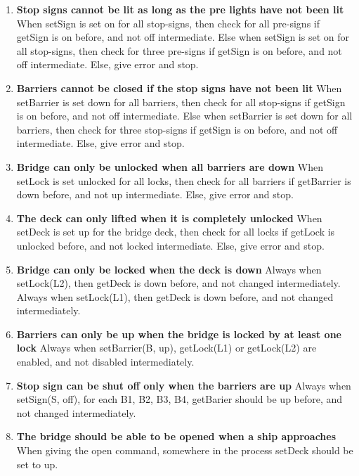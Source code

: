 \documentclass{article}
\begin{document}
\begin{enumerate}
	\item \textbf{Stop signs cannot be lit as long as the pre lights have not been lit}
	When setSign is set on for all stop-signs, then check for all pre-signs if getSign is on before, and not off intermediate.
	Else when setSign is set on for all stop-signs, then check for three pre-signs if getSign is on before, and not off intermediate.
	Else, give error and stop.

	\item \textbf{Barriers cannot be closed if the stop signs have not been lit}
	When setBarrier is set down for all barriers, then check for all stop-signs if getSign is on before, and not off intermediate.
	Else when setBarrier is set down for all barriers, then check for three stop-signs if getSign is on before, and not off intermediate.
	Else, give error and stop.

	\item \textbf{Bridge can only be unlocked when all barriers are down}
	When setLock is set unlocked for all locks, then check for all barriers if getBarrier is down before, and not up intermediate.
	Else, give error and stop.

	\item	\textbf{The deck can only lifted when it is completely unlocked}
	When setDeck is set up for the bridge deck, then check for all locks if getLock is unlocked before, and not locked intermediate.
	Else, give error and stop.

	\item \textbf{Bridge can only be locked when the deck is down}
	Always when setLock(L2), then getDeck is down before, and not changed intermediately.
	Always when setLock(L1), then getDeck is down before, and not changed intermediately.

	\item \textbf{Barriers can only be up when the bridge is locked by at least one lock}
	Always when setBarrier(B, up), getLock(L1) or getLock(L2) are enabled, and not disabled intermediately.

	\item \textbf{Stop sign can be shut off only when the barriers are up}
	Always when setSign(S, off), for each B1, B2, B3, B4, getBarier should be up before, and not changed intermediately.

	\item \textbf{The bridge should be able to be opened when a ship approaches}
	When giving the open command, somewhere in the process setDeck should be set to up.


\end{enumerate}
\end{document}
